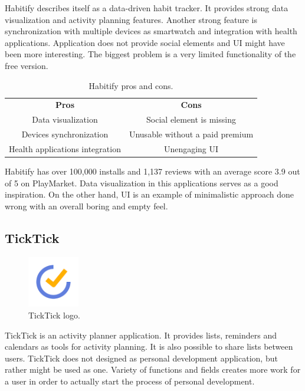 Habitify describes itself as a data-driven habit tracker.
It provides strong data visualization and activity planning features.
Another strong feature is synchronization with multiple devices as smartwatch and integration with health applications.
Application does not provide social elements and UI might have been more interesting.
The biggest problem is a very limited functionality of the free version.

\begin{table}[h!]
    \centering
    \begin{ctucolortab}
        \begin{tabular}{cc}
            \bfseries Pros & \bfseries Cons\\\Midrule
            Data visualization & Social element is missing\\
            Devices synchronization & Unusable without a paid premium\\
            Health applications integration & Unengaging UI \\
        \end{tabular}
    \end{ctucolortab}
    \caption{Habitify pros and cons.}\label{tab:habitify-pros-cons}
\end{table}

Habitify has over 100,000 installs and 1,137 reviews with an average score 3.9 out of 5 on PlayMarket.
Data visualization in this applications serves as a good inspiration.
On the other hand, UI is an example of minimalistic approach done wrong with an overall boring and empty feel.


\subsection{TickTick}\label{subsec:ticktick}

\begin{figure}[h!]
    \includegraphics[width=0.20\textwidth]{images/ticktick-logo.png}
    \caption{TickTick logo.\cite{ticktick-logo}}
    \label{fig:ticktick-logo}
\end{figure}

TickTick is an activity planner application.
It provides lists, reminders and calendars as tools for activity planning.
It is also possible to share lists between users.
TickTick does not designed as personal development application, but rather might be used as one.
Variety of functions and fields creates more work for a user in order to actually start the process of personal development.

